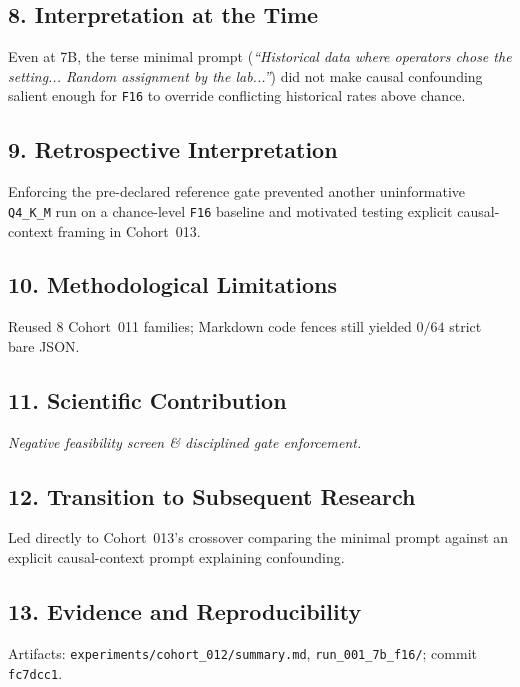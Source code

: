\subsection*{8. Interpretation at the Time}
Even at 7B, the terse minimal prompt (\emph{``Historical data where operators chose the setting... Random assignment by the lab...''}) did not make causal confounding salient enough for \texttt{F16} to override conflicting historical rates above chance.

\subsection*{9. Retrospective Interpretation}
Enforcing the pre-declared reference gate prevented another uninformative \texttt{Q4\_K\_M} run on a chance-level \texttt{F16} baseline and motivated testing explicit causal-context framing in Cohort~013.

\subsection*{10. Methodological Limitations}
Reused $8$ Cohort~011 families; Markdown code fences still yielded $0/64$ strict bare JSON.

\subsection*{11. Scientific Contribution}
\emph{Negative feasibility screen \& disciplined gate enforcement.}

\subsection*{12. Transition to Subsequent Research}
Led directly to Cohort~013's crossover comparing the minimal prompt against an explicit causal-context prompt explaining confounding.

\subsection*{13. Evidence and Reproducibility}
Artifacts: \texttt{experiments/cohort\_012/summary.md}, \texttt{run\_001\_7b\_f16/}; commit \texttt{fc7dcc1}.
